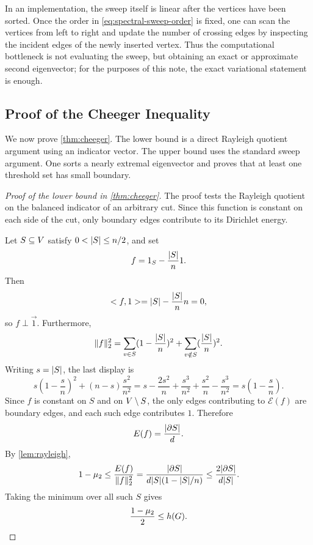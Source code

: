 In an implementation, the sweep itself is linear after the vertices have been sorted. Once the order in \cref{eq:spectral-sweep-order} is fixed, one can scan the vertices from left to right and update the number of crossing edges by inspecting the incident edges of the newly inserted vertex. Thus the computational bottleneck is not evaluating the sweep, but obtaining an exact or approximate second eigenvector; for the purposes of this note, the exact variational statement is enough.

\subsection{Proof of the Cheeger Inequality}
\label{subsec:cheeger-proof}

We now prove \cref{thm:cheeger}. The lower bound is a direct Rayleigh quotient argument using an indicator vector. The upper bound uses the standard sweep argument. One sorts a nearly extremal eigenvector and proves that at least one threshold set has small boundary.

\begin{proof}[Proof of the lower bound in \cref{thm:cheeger}]
	The proof tests the Rayleigh quotient on the balanced indicator of an arbitrary cut. Since this function is constant on each side of the cut, only boundary edges contribute to its Dirichlet energy.

	Let \(S\subseteq V\) satisfy \(0<\lvert S\rvert\leq n/2\), and set
	\begin{equation}
		f=1_S-\frac{\lvert S\rvert}{n}1.
	\end{equation}
	Then
	\begin{equation}
		< f,1>
		=
		\lvert S\rvert-\frac{\lvert S\rvert}{n}n
		=
		0,
	\end{equation}
	so \(f\perp\vec{1}\). Furthermore,
	\begin{equation}
		\lVert f\rVert_2^2
		=
		\sum_{v\in S}(1-\frac{\lvert S\rvert}{n})^2
		+
		\sum_{v\notin S}(\frac{\lvert S\rvert}{n})^2.
	\end{equation}
	Writing \(s=\lvert S\rvert\), the last display is
	\begin{equation}
		s\left(1-\frac{s}{n}\right)^2+(n-s)\frac{s^2}{n^2}
		=
		s-\frac{2s^2}{n}+\frac{s^3}{n^2}+\frac{s^2}{n}-\frac{s^3}{n^2}
		=
		s\left(1-\frac{s}{n}\right).
	\end{equation}
	Since \(f\) is constant on \(S\) and on \(V\setminus S\), the only edges contributing to \(\mathcal{E}(f)\) are boundary edges, and each such edge contributes \(1\). Therefore
	\begin{equation}
		E(f)=\frac{\lvert\partial S\rvert}{d}.
	\end{equation}
	By \cref{lem:rayleigh},
	\begin{equation}
		1-\mu_2\leq \frac{E(f)}{\lVert f\rVert_2^2}
		=\frac{\lvert\partial S\rvert}{d\lvert S\rvert(1-\lvert S\rvert/n)}
		\leq \frac{2\lvert\partial S\rvert}{d\lvert S\rvert}.
	\end{equation}
	Taking the minimum over all such \(S\) gives
	\begin{equation}
		\frac{1-\mu_2}{2}\leq h(G).
	\end{equation}
\end{proof}

